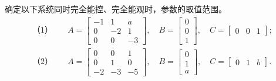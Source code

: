 \documentclass[11pt]{article}
\begin{document}

\begin{problem}[原题 6]
确定以下系统同时完全能控、完全能观时，参数的取值范围。
\begin{align*}
\text{（1）}\quad
&A=\begin{bmatrix}-1&1&a\\0&-2&1\\0&0&-3\end{bmatrix},\quad
B=\begin{bmatrix}0\\0\\1\end{bmatrix},\quad
C=\begin{bmatrix}0&0&1\end{bmatrix};\\[2mm]
\text{（2）}\quad
&A=\begin{bmatrix}0&0&1\\0&1&0\\-2&-3&-5\end{bmatrix},\quad
B=\begin{bmatrix}0\\1\\a\end{bmatrix},\quad
C=\begin{bmatrix}0&1&b\end{bmatrix}.
\end{align*}
\end{problem}
\end{document}
